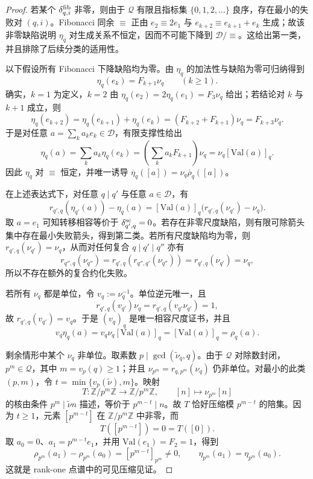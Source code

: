 \begin{proof}
若某个 \(\delta^{\rm fib}_{q,i}\) 非零，则由于 \(\mathcal Q\) 有限且指标集 \(\{0,1,2,\ldots\}\) 良序，存在最小的失败对 \((q,i)\)。Fibonacci 同余 \(\equiv\) 正由 \(e_2\equiv2e_1\) 与 \(e_{k+2}\equiv e_{k+1}+e_k\) 生成；故该非零缺陷说明 \(\eta_q\) 对生成关系不恒定，因而不可能下降到 \(\mathcal D/\!\equiv\)。这给出第一类，并且排除了后续分类的适用性。

以下假设所有 Fibonacci 下降缺陷均为零。由 \(\eta_q\) 的加法性与缺陷为零可归纳得到
\[
\eta_q(e_k)=F_{k+1}\nu_q\qquad(k\ge1).
\]
确实，\(k=1\) 为定义，\(k=2\) 由 \(\eta_q(e_2)=2\eta_q(e_1)=F_3\nu_q\) 给出；若结论对 \(k\) 与 \(k+1\) 成立，则
\[
\eta_q(e_{k+2})=\eta_q(e_{k+1})+\eta_q(e_k)=(F_{k+2}+F_{k+1})\nu_q=F_{k+3}\nu_q.
\]
于是对任意 \(a=\sum_k a_ke_k\in\mathcal D\)，有限支撑性给出
\[
\eta_q(a)=\sum_k a_k\eta_q(e_k)=\left(\sum_k a_kF_{k+1}\right)\nu_q
=\nu_q[\mathrm{Val}(a)]_q.
\]
因此 \(\eta_q\) 对 \(\equiv\) 恒定，并唯一诱导 \(\overline\eta_q([a])=\nu_q\overline\rho_q([a])\)。

在上述表达式下，对任意 \(q\mid q'\) 与任意 \(a\in\mathcal D\)，有
\[
r_{q',q}(\eta_{q'}(a))-\eta_q(a)
=[\mathrm{Val}(a)]_q\bigl(r_{q',q}(\nu_{q'})-\nu_q\bigr).
\]
取 \(a=e_1\) 可知转移相容等价于 \(\delta^{\rm sc}_{q',q}=0\)。若存在非零尺度缺陷，则有限可除箭头集中存在最小失败箭头，得到第二类。若所有尺度缺陷均为零，则 \(r_{q',q}(\nu_{q'})=\nu_q\)，从而对任何复合 \(q\mid q'\mid q''\) 亦有
\[
r_{q'',q}(\nu_{q''})=r_{q',q}(r_{q'',q'}(\nu_{q''}))=r_{q',q}(\nu_{q'})=\nu_q,
\]
所以不存在额外的复合约化失败。

若所有 \(\nu_q\) 都是单位，令 \(v_q:=\nu_q^{-1}\)。单位逆元唯一，且
\[
r_{q',q}(v_{q'})\nu_q
=r_{q',q}(v_{q'}\nu_{q'})=1,
\]
故 \(r_{q',q}(v_{q'})=v_q\)。于是 \((v_q)_q\) 是唯一相容尺度证书，并且
\[
v_q\eta_q(a)=v_q\nu_q[\mathrm{Val}(a)]_q=[\mathrm{Val}(a)]_q=\rho_q(a).
\]

剩余情形中某个 \(\nu_q\) 非单位。取素数 \(p\mid\gcd(\widetilde\nu_q,q)\)。由于 \(\mathcal Q\) 对除数封闭，\(p^m\in\mathcal Q\)，其中 \(m=v_p(q)\ge1\)；并且 \(\nu_{p^m}=r_{q,p^m}(\nu_q)\) 仍非单位。对最小的此类 \((p,m)\)，令 \(t=\min\{v_p(\widetilde\nu),m\}\)。映射
\[
T:\mathbb Z/p^m\mathbb Z\longrightarrow\mathbb Z/p^m\mathbb Z,
\qquad
[n]\longmapsto\nu_{p^m}[n]
\]
的核由条件 \(p^m\mid \widetilde\nu n\) 描述，等价于 \(p^{m-t}\mid n\)。故 \(T\) 恰好压缩模 \(p^{m-t}\) 的陪集。因为 \(t\ge1\)，元素 \([p^{m-t}]\) 在 \(\mathbb Z/p^m\mathbb Z\) 中非零，而
\[
T([p^{m-t}])=0=T([0]).
\]
取 \(a_0=0\)、\(a_1=p^{m-t}e_1\)，并用 \(\mathrm{Val}(e_1)=F_2=1\)，得到
\[
\rho_{p^m}(a_1)-\rho_{p^m}(a_0)=[p^{m-t}]_{p^m}\ne0,
\qquad
\eta_{p^m}(a_1)=\eta_{p^m}(a_0).
\]
这就是 rank-one 点谱中的可见压缩见证。


\end{proof}

